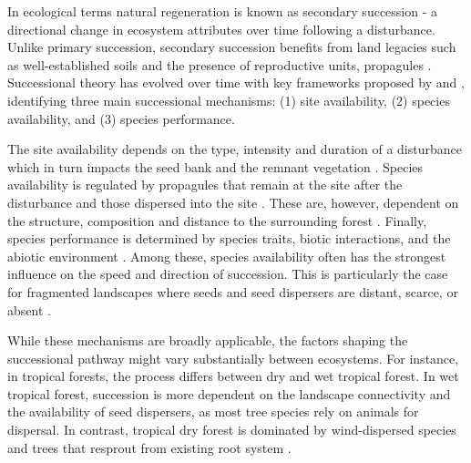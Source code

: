 In ecological terms natural regeneration is known as secondary succession - a directional change in ecosystem attributes over time following a disturbance. Unlike primary succession, secondary succession benefits from land legacies such as well-established soils and the presence of reproductive units, propagules \citep{poorterSuccessionalTheories2023}. %
Successional theory has evolved over time with 
key frameworks proposed by \citet{pickettHierarchicalConsiderationCauses1987} and \citet{poorterComprehensiveFrameworkVegetation2024}, identifying three main successional mechanisms: (1) site availability, (2) species availability, and (3) species performance. 

The site availability depends on the type, intensity and duration of a disturbance which in turn impacts the seed bank and the remnant vegetation \citep{poorterComprehensiveFrameworkVegetation2024}. Species availability is regulated by propagules that remain at the site after the disturbance and those dispersed into the site \citep{gleasonIndividualisticConceptPlant1926, dentUnitingNicheDifferentiation2021}. These are, however, dependent on the structure, composition and distance to the surrounding forest \citep{dentUnitingNicheDifferentiation2021}. Finally, species performance is determined by species traits, biotic interactions, and the abiotic environment \citep{poorterComprehensiveFrameworkVegetation2024}. Among these, species availability often has the strongest influence on the speed and direction of succession. This is particularly the case for fragmented landscapes where seeds and seed dispersers are distant, scarce, or absent \citep{poorterSuccessionalTheories2023, dentUnitingNicheDifferentiation2021}. 

While these mechanisms are broadly applicable, the factors shaping the successional pathway might vary substantially between ecosystems. For instance, in tropical forests, the process differs between dry and wet tropical forest. In wet tropical forest, succession is more dependent on the landscape connectivity and the availability of seed dispersers, as most tree species rely on animals for dispersal. In contrast, tropical dry forest is dominated by wind-dispersed species and trees that resprout from existing root system \citep{hordijkLandUseHistory2024, lohbeckSuccessionalChangesFunctional2013}.



